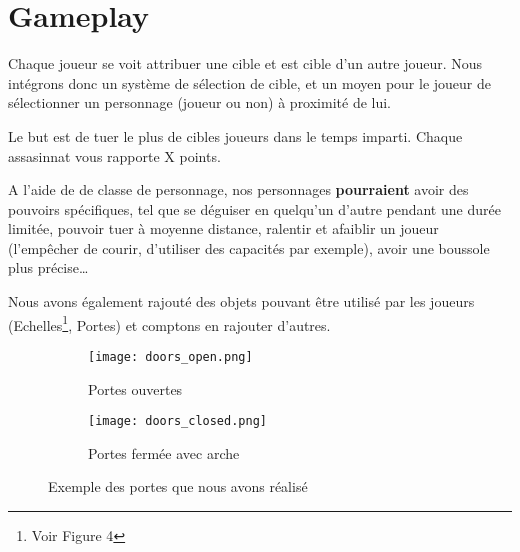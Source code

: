 \documentclass[../doc.tex]{subfiles}
\begin{document}
\section{Gameplay}

Chaque joueur se voit attribuer une cible et est cible d'un autre joueur.
Nous intégrons donc un système de sélection de cible, et un moyen pour le joueur de sélectionner un personnage (joueur ou non) à proximité de lui.

Le but est de tuer le plus de cibles joueurs dans le temps imparti.
Chaque assasinnat vous rapporte X points.

A l'aide de de classe de personnage, nos personnages \textbf{pourraient} avoir des pouvoirs spécifiques,
tel que se déguiser en quelqu'un d'autre pendant une durée limitée,
pouvoir tuer à moyenne distance, ralentir et afaiblir un joueur
(l'empêcher de courir, d'utiliser des capacités par exemple), avoir une boussole plus précise\dots


Nous avons également rajouté des objets pouvant être utilisé par les joueurs
(Echelles\footnote{Voir Figure 4}, Portes) et comptons en rajouter d'autres.
\begin{figure}[hbt!]
    \centering
    \begin{subfigure}[t]{0.3\textwidth}
        \texttt{[image: doors\_open.png]} 
        \caption{Portes ouvertes}
    \end{subfigure}
    \hspace{50pt}
    \begin{subfigure}[t]{0.3\textwidth}
        \texttt{[image: doors\_closed.png]}
        \caption{Portes fermée avec arche}
    \end{subfigure}
    \caption{Exemple des portes que nous avons réalisé}
\end{figure}
\end{document}

